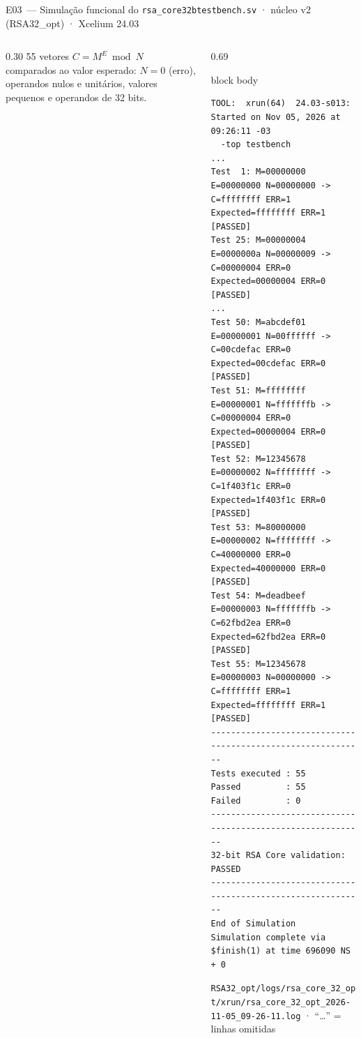 \documentclass[aspectratio=169,10pt,t]{beamer}
\begin{document}
\begin{frame}[fragile]{E03~— Simulação funcional do \texttt{rsa\_core32b}}{\texttt{testbench.sv} · núcleo v2 (RSA32\_opt) · Xcelium 24.03}
  \vspace*{-0.3cm}
  \begin{columns}[T]
    \begin{column}{0.30\textwidth}
      \vspace{0.2cm}
      {\scriptsize 55 vetores $C = M^E \bmod N$ comparados ao valor esperado: $N = 0$ (erro), operandos nulos e unitários, valores pequenos e operandos de 32 bits.}
    \end{column}
    \begin{column}{0.69\textwidth}
      \tiny
      \begin{beamercolorbox}[rounded=true,shadow=false,sep=3pt]{block body}
\vspace*{-0.6\baselineskip}
\fontsize{4.7}{5.5}\selectfont
\begin{verbatim}
TOOL:  xrun(64)  24.03-s013: Started on Nov 05, 2026 at 09:26:11 -03
  -top testbench
...
Test  1: M=00000000 E=00000000 N=00000000 -> C=ffffffff ERR=1  Expected=ffffffff ERR=1 [PASSED]
Test 25: M=00000004 E=0000000a N=00000009 -> C=00000004 ERR=0  Expected=00000004 ERR=0 [PASSED]
...
Test 50: M=abcdef01 E=00000001 N=00ffffff -> C=00cdefac ERR=0  Expected=00cdefac ERR=0 [PASSED]
Test 51: M=ffffffff E=00000001 N=fffffffb -> C=00000004 ERR=0  Expected=00000004 ERR=0 [PASSED]
Test 52: M=12345678 E=00000002 N=ffffffff -> C=1f403f1c ERR=0  Expected=1f403f1c ERR=0 [PASSED]
Test 53: M=80000000 E=00000002 N=ffffffff -> C=40000000 ERR=0  Expected=40000000 ERR=0 [PASSED]
Test 54: M=deadbeef E=00000003 N=fffffffb -> C=62fbd2ea ERR=0  Expected=62fbd2ea ERR=0 [PASSED]
Test 55: M=12345678 E=00000003 N=00000000 -> C=ffffffff ERR=1  Expected=ffffffff ERR=1 [PASSED]
------------------------------------------------------------
Tests executed : 55
Passed         : 55
Failed         : 0
------------------------------------------------------------
32-bit RSA Core validation: PASSED
------------------------------------------------------------
End of Simulation
Simulation complete via $finish(1) at time 696090 NS + 0
\end{verbatim}
\vspace*{-0.6\baselineskip}
      \end{beamercolorbox}
      {\tiny \texttt{RSA32\_opt/logs/rsa\_core\_32\_opt/xrun/rsa\_core\_32\_opt\_2026-11-05\_09-26-11.log} · ``\dots'' = linhas omitidas}
    \end{column}
  \end{columns}
\end{frame}
\end{document}
